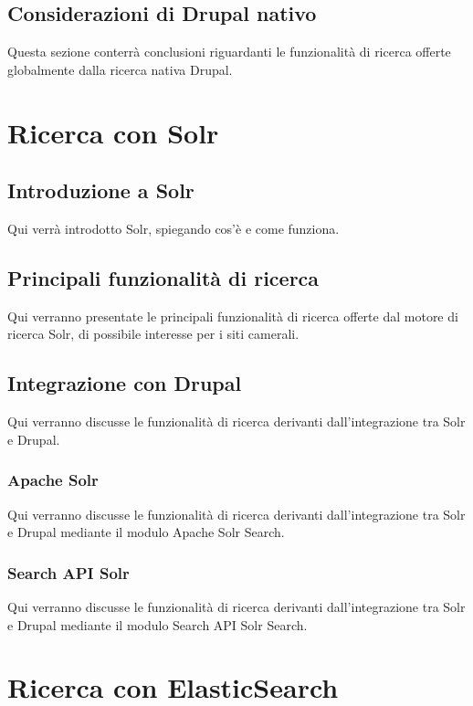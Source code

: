 		\subsection{Considerazioni di Drupal nativo}
		Questa sezione conterrà conclusioni riguardanti le funzionalità di ricerca offerte globalmente dalla ricerca nativa Drupal.

	\section{Ricerca con Solr}

		\subsection{Introduzione a Solr}
		Qui verrà introdotto Solr, spiegando cos'è e come funziona.
		
		\subsection{Principali funzionalità di ricerca}
		Qui verranno presentate le principali funzionalità di ricerca offerte dal motore di ricerca Solr, di possibile interesse per i siti camerali.
			
		\subsection{Integrazione con Drupal}
		Qui verranno discusse le funzionalità di ricerca derivanti dall'integrazione tra Solr e Drupal.
			
			\subsubsection{Apache Solr}
			Qui verranno discusse le funzionalità di ricerca derivanti dall'integrazione tra Solr e Drupal mediante il modulo Apache Solr Search.
			
			\subsubsection{Search API Solr}
			Qui verranno discusse le funzionalità di ricerca derivanti dall'integrazione tra Solr e Drupal mediante il modulo Search API Solr Search.
	
	\section{Ricerca con ElasticSearch}
	
